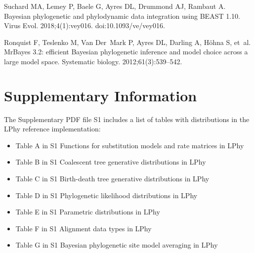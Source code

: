 \documentclass[10pt,letterpaper,table]{article}
\theoremstyle{definition}
\begin{document}
\begin{thebibliography}{10}
Suchard MA, Lemey P, Baele G, Ayres DL, Drummond AJ, Rambaut A.
\newblock Bayesian phylogenetic and phylodynamic data integration using BEAST
  1.10.
\newblock Virus Evol. 2018;4(1):vey016.
\newblock doi:{10.1093/ve/vey016}.

Ronquist F, Teslenko M, Van Der~Mark P, Ayres DL, Darling A, H{\"o}hna S,
  et~al.
\newblock MrBayes 3.2: efficient Bayesian phylogenetic inference and model
  choice across a large model space.
\newblock Systematic biology. 2012;61(3):539--542.

\end{thebibliography}

\section*{Supplementary Information}

The Supplementary PDF file S1 includes a list of tables with distributions in the LPhy reference implementation: 

\begin{itemize}
\item Table A in S1 Functions for substitution models and rate matrices in LPhy

\item Table B in S1 Coalescent tree generative distributions in LPhy

\item Table C in S1 Birth-death tree generative distributions in LPhy

\item Table D in S1 Phylogenetic likelihood distributions in LPhy

\item Table E in S1 Parametric distributions in LPhy

\item Table F in S1 Alignment data types in LPhy

\item Table G in S1 Bayesian phylogenetic site model averaging in LPhy
\end{itemize}
\end{document}
